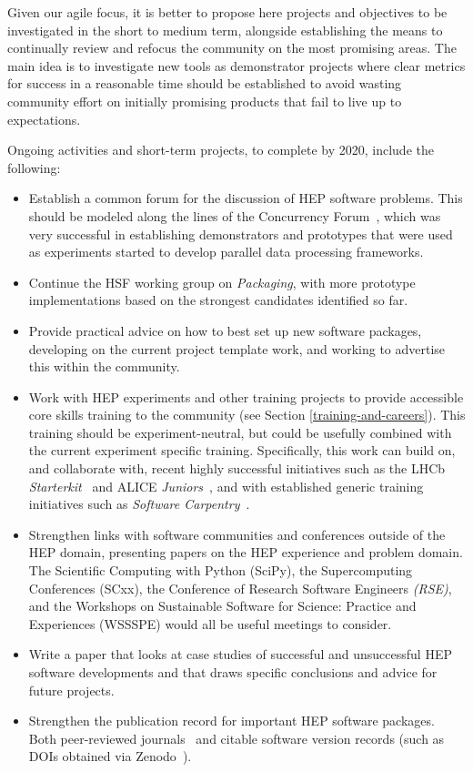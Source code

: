 Given our agile focus, it is better to propose here projects and
objectives to be investigated in the short to medium term, alongside
establishing the means to continually review and refocus the community
on the most promising areas. The main idea is to investigate new tools
as demonstrator projects where clear metrics for success in a reasonable
time should be established to avoid wasting community effort on
initially promising products that fail to live up to expectations.

Ongoing activities and short-term projects, to complete by 2020,
include the following:

\begin{itemize}
\item
  Establish a common forum for the discussion of HEP software problems.
  This should be modeled along the lines of the Concurrency Forum~\cite{ConcurrencyForum}, which was very successful in establishing
  demonstrators and prototypes that were used as experiments started to
  develop parallel data processing frameworks.
\item
  Continue the HSF working group on \emph{Packaging}, with more
  prototype implementations based on the strongest candidates identified
  so far.
\item
  Provide practical advice on how to best set up new software packages,
  developing on the current project template work, and working to
  advertise this within the community.
\item
  Work with HEP experiments and other training projects to provide
  accessible core skills training to the community (see Section \ref{training-and-careers}). This
  training should be experiment-neutral, but could be usefully combined
  with the current experiment specific training. Specifically, this work
  can build on, and collaborate with, recent highly successful
  initiatives such as the LHCb \emph{Starterkit}~\cite{LHCbStarterkit}
  and ALICE \emph{Juniors}~\cite{ALICEJuniors}, and with established
  generic training initiatives such as \emph{Software Carpentry}~\cite{SoftwareCarpentry}.
\item
  Strengthen links with software communities and conferences outside of
  the HEP domain, presenting papers on the HEP experience and problem
  domain. The Scientific Computing with Python (SciPy), the
  Supercomputing Conferences (SCxx), the Conference of
  Research Software Engineers \emph{(RSE)}, and the Workshops on
  Sustainable Software for Science: Practice and Experiences (WSSSPE)
  would all be useful meetings to consider.
\item
  Write a paper that looks at case studies of successful and
  unsuccessful HEP software developments and that draws specific
  conclusions and advice for future projects.
\item
  Strengthen the publication record for important HEP software packages.
  Both peer-reviewed journals~\cite{SSI2017} and citable software version
  records (such as DOIs obtained via Zenodo~\cite{Zenodo}).
\end{itemize}

